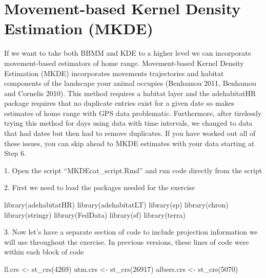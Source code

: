 \documentclass[
  letterpaper,
]{book}
\newenvironment{Shaded}{\begin{snugshade}}{\end{snugshade}}
\newcommand{\DecValTok}[1]{\textcolor[rgb]{0.68,0.00,0.00}{#1}}
\newcommand{\FunctionTok}[1]{\textcolor[rgb]{0.28,0.35,0.67}{#1}}
\newcommand{\NormalTok}[1]{\textcolor[rgb]{0.00,0.23,0.31}{#1}}
\newcommand{\OtherTok}[1]{\textcolor[rgb]{0.00,0.23,0.31}{#1}}
\begin{document}
\hypertarget{movement-based-kernel-density-estimation-mkde}{%
\chapter{Movement-based Kernel Density Estimation
(MKDE)}\label{movement-based-kernel-density-estimation-mkde}}

If we want to take both BBMM and KDE to a higher level we can
incorporate movement-based estimators of home range. Movement-based
Kernel Density Estimation (MKDE) incorporates movements trajectories and
habitat components of the landscape your animal occupies (Benhamou 2011,
Benhamou and Cornelis 2010). This method requires a habitat layer and
the adehabitatHR package requires that no duplicate entries exist for a
given date so makes estimates of home range with GPS data problematic.
Furthermore, after tirelessly trying this method for days using data
with time intervals, we changed to data that had dates but then had to
remove duplicates. If you have worked out all of these issues, you can
skip ahead to MKDE estimates with your data starting at Step 6.

1. Open the script ``MKDEcat\_script.Rmd'' and run code directly from
the script

2. First we need to load the packages needed for the exercise

\begin{Shaded}
\begin{Highlighting}[]
\FunctionTok{library}\NormalTok{(adehabitatHR)}
\FunctionTok{library}\NormalTok{(adehabitatLT)}
\FunctionTok{library}\NormalTok{(sp)}
\FunctionTok{library}\NormalTok{(chron) }
\FunctionTok{library}\NormalTok{(stringr)}
\FunctionTok{library}\NormalTok{(FedData)}
\FunctionTok{library}\NormalTok{(sf)}
\FunctionTok{library}\NormalTok{(terra)}
\end{Highlighting}
\end{Shaded}

3. Now let's have a separate section of code to include projection
information we will use throughout the exercise. In previous versions,
these lines of code were within each block of code

\begin{Shaded}
\begin{Highlighting}[]
\NormalTok{ll.crs }\OtherTok{\textless{}{-}} \FunctionTok{st\_crs}\NormalTok{(}\DecValTok{4269}\NormalTok{)}
\NormalTok{utm.crs }\OtherTok{\textless{}{-}} \FunctionTok{st\_crs}\NormalTok{(}\DecValTok{26917}\NormalTok{)}
\NormalTok{albers.crs }\OtherTok{\textless{}{-}} \FunctionTok{st\_crs}\NormalTok{(}\DecValTok{5070}\NormalTok{)}
\end{Highlighting}
\end{Shaded}
\end{document}
